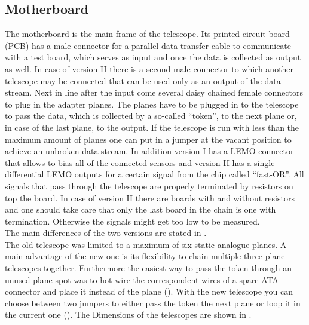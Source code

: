 \documentclass[british,11pt,a4paper]{memoir}
\begin{document}
\subsection{Motherboard}\label{s210}
The motherboard is the main frame of the telescope. Its printed circuit board (PCB) has a male connector for a parallel data transfer cable to communicate with a test board, which serves as input and once the data is collected as output as well. In case of version II there is a second male connector to which another telescope may be connected that can be used only as an output of the data stream. Next in line after the input come several daisy chained female connectors to plug in the adapter planes. The planes have to be plugged in to the telescope to pass the data, which is collected by a so-called ``token'', to the next plane or, in case of the last plane, to the output. If the telescope is run with less than the maximum amount of planes one can put in a jumper at the vacant position to achieve an unbroken data stream. In addition version I has a LEMO connector that allows to bias all of the connected sensors and version II has a single differential LEMO outputs for a certain signal from the chip called ``fast-OR''. All signals that pass through the telescope are properly terminated by resistors on top the board. In case of version II there are boards with and without resistors and one should take care that only the last board in the chain is one with termination. Otherwise the signals might get too low to be measured.\\
The main differences of the two versions are stated in .\\
The old telescope was limited to a maximum of six static analogue planes. A main advantage of the new one is its flexibility to chain multiple three-plane telescopes together. %
Furthermore the easiest way to pass the token through an unused plane spot was to hot-wire the correspondent wires of a spare ATA connector and place it instead of the plane (). With the new telescope you can choose between two jumpers to either pass the token the next plane or loop it in the current one (). The Dimensions of the telescopes are shown in .
\end{document}
